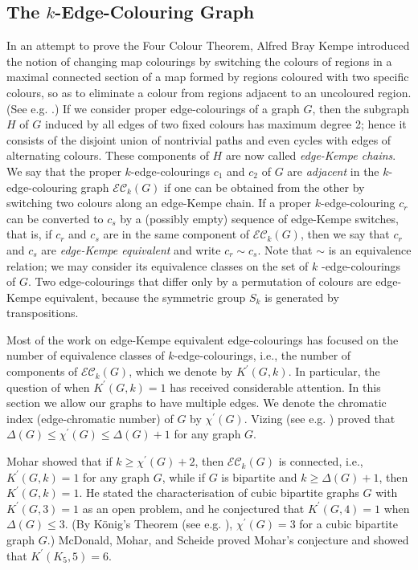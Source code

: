 \documentclass[12pt]{article}%
\begin{document}
\subsection{The $k$-Edge-Colouring Graph}

\label{SecKempe}In an attempt to prove the Four Colour Theorem, Alfred Bray
Kempe introduced the notion of changing map colourings by switching the
colours of regions in a maximal connected section of a map formed by regions
coloured with two specific colours, so as to eliminate a colour from regions
adjacent to an uncoloured region. (See e.g. \cite[Chapter 16]{26CM-CL}.) If we
consider proper edge-colourings of a graph $G$, then the subgraph $H$ of $G$
induced by all edges of two fixed colours has maximum degree 2; hence it
consists of the disjoint union of nontrivial paths and even cycles with edges
of alternating colours. These components of $H$ are now called
\emph{edge-Kempe chains}. We say that the proper $k$-edge-colourings $c_{1}$
and $c_{2}$ of $G$ are \emph{adjacent} in the $k$-edge-colouring graph
$\mathcal{EC}_{k}(G)$ if one can be obtained from the other by switching two
colours along an edge-Kempe chain. If a proper $k$-edge-colouring $c_{r}$ can
be converted to $c_{s}$ by a (possibly empty) sequence of edge-Kempe switches,
that is, if $c_{r}$ and $c_{s}$ are in the same component of $\mathcal{EC}%
_{k}(G)$, then we say that $c_{r}$ and $c_{s}$ are \emph{edge-Kempe
equivalent} and write $c_{r}\sim c_{s}$. Note that $\sim$ is an equivalence
relation; we may consider its equivalence classes on the set of $k$%
-edge-colourings of $G$. Two edge-colourings that differ only by a permutation
of colours are edge-Kempe equivalent, because the symmetric group $S_{k}$ is
generated by transpositions.

Most of the work on edge-Kempe equivalent edge-colourings has focused on the
number of equivalence classes of $k$-edge-colourings, i.e., the number of
components of $\mathcal{EC}_{k}(G)$, which we denote by $K^{\prime}(G,k)$. In
particular, the question of when $K^{\prime}(G,k)=1$ has received considerable
attention. In this section we allow our graphs to have multiple edges. We
denote the chromatic index (edge-chromatic number) of $G$ by $\chi^{\prime
}(G)$. Vizing (see e.g. \cite[Theorem 17.2]{26CM-CL}) proved that
$\Delta(G)\leq\chi^{\prime}(G)\leq\Delta(G)+1$ for any graph $G$.

Mohar \cite{26CM-Mohar} showed that if $k\geq\chi^{\prime}(G)+2$, then
$\mathcal{EC}_{k}(G)$ is connected, i.e., $K^{\prime}(G,k)=1$ for any graph
$G$, while if $G$ is bipartite and $k\geq\Delta(G)+1$, then $K^{\prime
}(G,k)=1$. He stated the characterisation of cubic bipartite graphs $G$ with
$K^{\prime}(G,3)=1$ as an open problem, and he conjectured that $K^{\prime
}(G,4)=1$ when $\Delta(G)\leq3$. (By K\"{o}nig's Theorem (see e.g.
\cite[Theorem 17.7]{26CM-CL}), $\chi^{\prime}(G)=3$ for a cubic bipartite
graph $G$.) McDonald, Mohar, and Scheide \cite{26CM-MMS} proved Mohar's
conjecture and showed that $K^{\prime}(K_{5},5)=6$.
\end{document}
